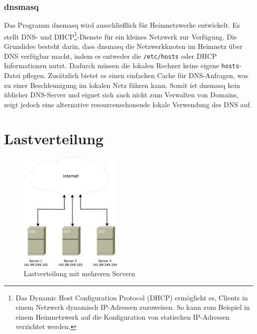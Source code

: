\documentclass[a4paper, 12pt, BCOR10mm, DIV12, toc=bibliography, toc=listof, german]{scrbook}
\begin{document}

				\subsubsection*{dnsmasq} %

				Das Programm dnsmasq \cite{dnsmasq} wird ausschließlich für Heimnetzwerke entwickelt. Es
				stellt DNS- und DHCP\footnote{Das Dynamic Host Configuration Protocol (DHCP) \cite{rfc2131}
				ermöglicht es, Clients in einem Netzwerk dynamisch IP-Adressen zuzuweisen. So kann zum
				Beispiel in einem Heimnetzwerk auf die Konfiguration von statischen IP-Adressen verzichtet
				werden.}-Dienste für ein kleines Netzwerk zur Verfügung. Die Grundidee besteht darin, dass dnsmasq
				die Netzwerkknoten im Heimnetz über DNS verfügbar macht, indem es entweder die
				\texttt{/etc/hosts} oder DHCP Informationen nutzt. Dadurch müssen die lokalen Rechner keine
				eigene \texttt{hosts}-Datei pflegen.  Zusätzlich bietet es einen einfachen Cache für
				DNS-Anfragen, was zu einer Beschleunigung im lokalen Netz führen kann. Somit ist dnsmasq
				kein üblicher DNS-Server und eignet sich auch nicht zum Verwalten von Domains, zeigt jedoch
				eine alternative resourcenschonende lokale Verwendung des DNS auf.




		\section{Lastverteilung} %
		\label{sec:lastverteilung}

		\begin{figure}
			\centering
			\includegraphics[width=5cm]{images/internet-server}
			\caption{Lastverteilung mit mehreren Servern}
			\label{fig:lastverteilung}
		\end{figure}
\end{document}
